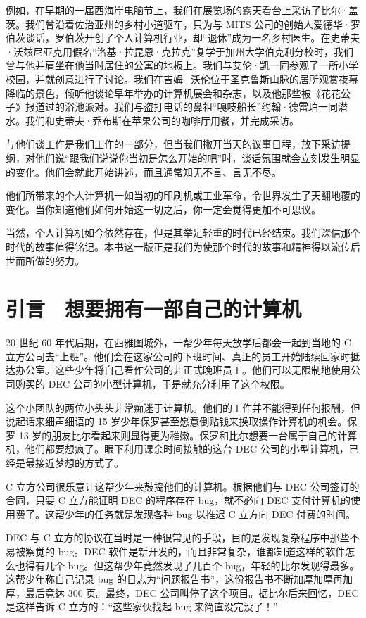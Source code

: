 \documentclass[12pt,UTF8]{ctexbook}
\begin{document}
例如，在早期的一届西海岸电脑节上，我们在展览场的露天看台上采访了比尔·盖茨。我们曾沿着佐治亚州的乡村小道驱车，只为与 MITS 公司的创始人爱德华·罗伯茨谈话，罗伯茨开创了个人计算机行业，却“退休”成为一名乡村医生。在史蒂夫·沃兹尼亚克用假名“洛基·拉昆恩·克拉克”复学于加州大学伯克利分校时，我们曾与他并肩坐在他当时居住的公寓的地板上。我们与艾伦·凯一同参观了一所小学校园，并就创意进行了讨论。我们在吉姆·沃伦位于圣克鲁斯山脉的居所观赏夜幕降临的景色，倾听他谈论早年举办的计算机展会和杂志，以及他那些被《花花公子》报道过的浴池派对。我们与盗打电话的鼻祖“嘎吱船长”约翰·德雷珀一同潜水。我们和史蒂夫·乔布斯在苹果公司的咖啡厅用餐，并完成采访。

与他们谈工作是我们工作的一部分，但当我们撇开当天的议事日程，放下采访提纲，对他们说“跟我们说说你当初是怎么开始的吧”时，谈话氛围就会立刻发生明显的变化。他们会就此开始讲述，而且通常知无不言、言无不尽。

他们所带来的个人计算机一如当初的印刷机或工业革命，令世界发生了天翻地覆的变化。当你知道他们如何开始这一切之后，你一定会觉得更加不可思议。

当然，个人计算机如今依然存在，但是其举足轻重的时代已经结束。我们深信那个时代的故事值得铭记。本书这一版正是我们为使那个时代的故事和精神得以流传后世而所做的努力。

\chapter{引言　想要拥有一部自己的计算机}

20 世纪 60 年代后期，在西雅图城外，一帮少年每天放学后都会一起到当地的 C 立方公司去“上班”。他们会在这家公司的下班时间、真正的员工开始陆续回家时抵达办公室。这些少年将自己看作公司的非正式晚班员工。他们可以无限制地使用公司购买的 DEC 公司的小型计算机，于是就充分利用了这个权限。

这个小团队的两位小头头非常痴迷于计算机。他们的工作并不能得到任何报酬，但说起话来细声细语的 15 岁少年保罗甚至愿意倒贴钱来换取操作计算机的机会。保罗 13 岁的朋友比尔看起来则显得更为稚嫩。保罗和比尔想要一台属于自己的计算机，他们都要想疯了。眼下利用课余时间接触的这台 DEC 公司的小型计算机，已经是最接近梦想的方式了。

C 立方公司很乐意让这帮少年来鼓捣他们的计算机。根据他们与 DEC 公司签订的合同，只要 C 立方能证明 DEC 的程序存在 bug，就不必向 DEC 支付计算机的使用费了。这帮少年的任务就是发现各种 bug 以推迟 C 立方向 DEC 付费的时间。

DEC 与 C 立方的协议在当时是一种很常见的手段，目的是发现复杂程序中那些不易被察觉的 bug。DEC 软件是新开发的，而且非常复杂，谁都知道这样的软件怎么也得有几个 bug。但这帮少年竟然发现了几百个 bug，年轻的比尔发现得最多。这帮少年称自己记录 bug 的日志为“问题报告书”，这份报告书不断加厚加厚再加厚，最后竟达 300 页。最终，DEC 公司叫停了这个项目。据比尔后来回忆，DEC 是这样告诉 C 立方的：“这些家伙找起 bug 来简直没完没了！”
\end{document}
